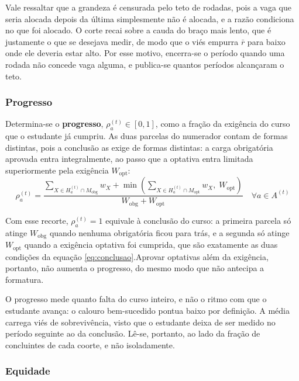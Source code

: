 \documentclass[
    12pt,
    openany,
    oneside,
    a4paper,
    english,
    brazil
]{abntex2}
\begin{document}
Vale ressaltar que a grandeza é censurada pelo teto de rodadas, pois a vaga que seria alocada depois da última simplesmente não é alocada, e a razão condiciona no que foi alocado. O corte recai sobre a cauda do braço mais lento, que é justamente o que se desejava medir, de modo que o viés empurra $\bar{r}$ para baixo onde ele deveria estar alto. Por esse motivo, encerra-se o período quando uma rodada não concede vaga alguma, e publica-se quantos períodos alcançaram o teto.

\subsubsection{Progresso}

Determina-se o \textbf{progresso}, $\rho_a^{(t)} \in [0, 1]$, como a fração da exigência do curso que o estudante já cumpriu. As duas parcelas do numerador contam de formas distintas, pois a conclusão as exige de formas distintas: a carga obrigatória aprovada entra integralmente, ao passo que a optativa entra limitada superiormente pela exigência $W_\text{opt}$:
\begin{equation}
    \rho_a^{(t)} = \frac{
        \sum_{X \in H_a^{(t)} \cap M_\text{obg}} w_{X}
        + \min \left(
            \sum_{X \in H_a^{(t)} \cap M_\text{opt}} w_{X},
            \; W_\text{opt}
        \right)
    }{
        W_\text{obg} + W_\text{opt}
    }
    \quad \forall a \in A^{(t)}
\end{equation}

Com esse recorte, $\rho_a^{(t)} = 1$ equivale à conclusão do curso: a primeira parcela só atinge $W_\text{obg}$ quando nenhuma obrigatória ficou para trás, e a segunda só atinge $W_\text{opt}$ quando a exigência optativa foi cumprida, que são exatamente as duas condições da equação \eqref{eq:conclusao}.Aprovar optativas além da exigência, portanto, não aumenta o progresso, do mesmo modo que não antecipa a formatura.

O progresso mede quanto falta do curso inteiro, e não o ritmo com que o estudante avança: o calouro bem-sucedido pontua baixo por definição. A média carrega viés de sobrevivência, visto que o estudante deixa de ser medido no período seguinte ao da conclusão. Lê-se, portanto, ao lado da fração de concluintes de cada coorte, e não isoladamente.

\subsubsection{Equidade}
\end{document}
